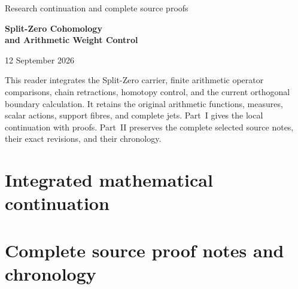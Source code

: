 \documentclass[11pt,a4paper]{article}
\theoremstyle{definition}
\theoremstyle{remark}
\begin{document}
\begin{titlepage}
\centering
\vspace*{25mm}
{\Large Research continuation and complete source proofs\par}
\vspace{12mm}
{\Huge\bfseries Split-Zero Cohomology\\[5mm]and Arithmetic Weight Control\par}
\vspace{15mm}
{\Large 12 September 2026\par}
\vfill
\begin{minipage}{0.87\textwidth}
This reader integrates the Split-Zero carrier, finite arithmetic operator
comparisons, chain retractions, homotopy control, and the current
orthogonal boundary calculation. It retains the original arithmetic
functions, measures, scalar actions, support fibres, and complete jets.
Part~I gives the local continuation with proofs. Part~II preserves the
complete selected source notes, their exact revisions, and their chronology.
\end{minipage}
\vspace{22mm}
\end{titlepage}
\tableofcontents
\clearpage
\part{Integrated mathematical continuation}







\clearpage
\part{Complete source proof notes and chronology}
\appendix
\sloppy

\end{document}
